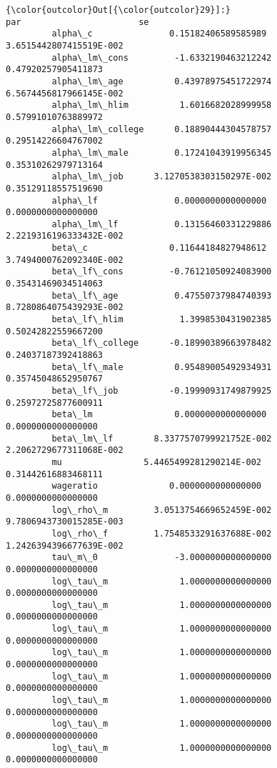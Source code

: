 \documentclass[11pt]{article}
\begin{document}
\begin{Verbatim}[commandchars=\\\{\}]
{\color{outcolor}Out[{\color{outcolor}29}]:}                                       par                       se
         alpha\_c               0.15182406589585989  3.6515442807415519E-002
         alpha\_lm\_cons         -1.6332190463212242      0.47920257905411873
         alpha\_lm\_age          0.43978975451722974  6.5674456817966145E-002
         alpha\_lm\_hlim          1.6016682028999958      0.57991010763889972
         alpha\_lm\_college      0.18890444304578757      0.29514226604767002
         alpha\_lm\_male         0.17241043919956345      0.35310262979713164
         alpha\_lm\_job      3.1270538303150297E-002      0.35129118557519690
         alpha\_lf               0.0000000000000000       0.0000000000000000
         alpha\_lm\_lf           0.13156460331229886  2.2219316196333432E-002
         beta\_c                0.11644184827948612  3.7494000762092340E-002
         beta\_lf\_cons         -0.76121050924083900      0.35431469034514063
         beta\_lf\_age           0.47550737984740393  8.7280864075439293E-002
         beta\_lf\_hlim           1.3998530431902385      0.50242822559667200
         beta\_lf\_college      -0.18990389663978482      0.24037187392418863
         beta\_lf\_male          0.95489005492934931      0.35745048652950767
         beta\_lf\_job          -0.19990931749879925      0.25972725877600911
         beta\_lm                0.0000000000000000       0.0000000000000000
         beta\_lm\_lf        8.3377570799921752E-002  2.2062729677311068E-002
         mu                5.4465499281290214E-002      0.31442616883468111
         wageratio              0.0000000000000000       0.0000000000000000
         log\_rho\_m         3.0513754669652459E-002  9.7806943730015285E-003
         log\_rho\_f         1.7548533291637688E-002  1.2426394396677639E-002
         tau\_m\_0               -3.0000000000000000       0.0000000000000000
         log\_tau\_m              1.0000000000000000       0.0000000000000000
         log\_tau\_m              1.0000000000000000       0.0000000000000000
         log\_tau\_m              1.0000000000000000       0.0000000000000000
         log\_tau\_m              1.0000000000000000       0.0000000000000000
         log\_tau\_m              1.0000000000000000       0.0000000000000000
         log\_tau\_m              1.0000000000000000       0.0000000000000000
         log\_tau\_m              1.0000000000000000       0.0000000000000000
         log\_tau\_m              1.0000000000000000       0.0000000000000000

\end{Verbatim}
\end{document}
